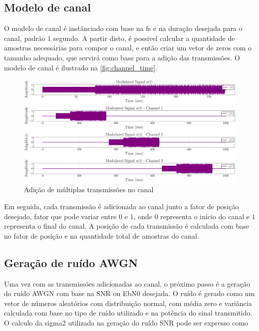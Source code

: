 \subsection{Modelo de canal}\label{sec:modelo_canal}

O modelo de canal é instânciado com base na \gls{fs} e na duração desejada para o canal, padrão $1$ segundo. A partir disto, é possivel calcular a quantidade de amostras necessárias para compor o canal, e então criar um vetor de zeros com o tamanho adequado, que servirá como base para a adição das transmissões. O modelo de canal é ilustrado na \autoref{fig:channel_time}.

\begin{figure}[H]
	\centering
	\caption{Adição de múltiplas transmissões no canal}\label{fig:channel_time}
	\includegraphics[width=\linewidth]{assets/cap3/example_channel_time_subchannels.pdf}
\end{figure}

Em seguida, cada transmissão é adicionada ao canal junto a fator de posição desejado, fator que pode variar entre $0$ e $1$, onde $0$ representa o início do canal e $1$ representa o final do canal. A posição de cada transmissão é calculada com base no fator de posição e na quantidade total de amostras do canal. 

\subsection{Geração de ruído AWGN}\label{sec:geracao_ruido}

Uma vez com as transmissões adicionadas ao canal, o próximo passo é a geração do ruído \gls{AWGN} com base na \gls{SNR} ou \gls{EbN0} desejada. O ruído é gerado como um vetor de números aleatórios com distribuição normal, com média zero e variância calculada com base no tipo de ruído utilizado e na potência do sinal transmitido. O calculo da \gls{sigma2} utilizada na geração do ruído \gls{SNR} pode ser expresso como

